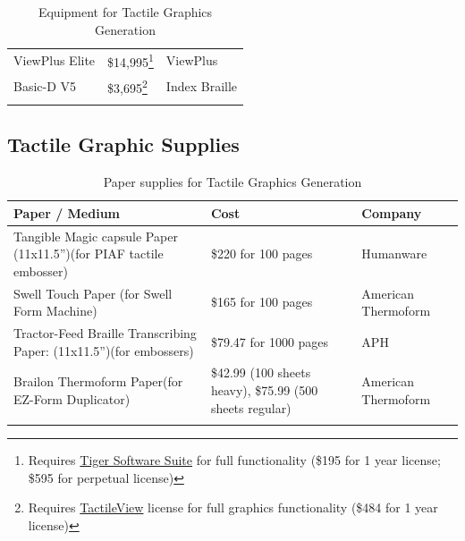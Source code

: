\documentclass[14pt, letterpaper,twoside]{extreport}
\begin{document}
\begin{longtable}[]{@{}
	>{\raggedright\arraybackslash}p{}
	>{\raggedright\arraybackslash}p{}
	>{\raggedright\arraybackslash}p{}@{}
	}
	ViewPlus Elite                                      & \$14,995\footnote{Requires \href{https://viewplus.com/product/tiger-software-suite8/}{Tiger Software Suite} for full functionality (\$195 for 1 year license; \$595 for perpetual license)} & ViewPlus            \\[1.0em]
	Basic-D V5                                          & \$3,695\footnote{Requires \href{https://tactileview.com/}{TactileView} license for full graphics functionality (\$484 for 1 year license)}                                                  & Index Braille       \\[1.0em]\hline \caption{ Equipment for Tactile Graphics Generation}
\end{longtable}



\hypertarget{tactile-paper}{%
	\subsection*{Tactile Graphic Supplies}\label{tactile-paper}}


\begin{longtable}[]{@{}
	>{\raggedright\arraybackslash}p{}
	>{\raggedright\arraybackslash}p{}
	>{\raggedright\arraybackslash}p{}@{}
	}
	\toprule\noalign{}

	\textbf{Paper / Medium}                                                    & \textbf{Cost}                                            & \textbf{Company}    \\
	\midrule\noalign{}
	\endhead
	\bottomrule\noalign{}
	\endlastfoot
	Tangible Magic capsule Paper (11x11.5'')\break(for PIAF tactile embosser)  & \$220 for 100 pages                                      & Humanware           \\[1.0em]
	Swell Touch Paper \break (for Swell Form Machine)                          & \$165 for 100 pages                                      & American Thermoform \\[1.0em]
	Tractor-Feed Braille Transcribing Paper: (11x11.5'')\break (for embossers) & \$79.47 for 1000 pages                                   & APH                 \\[1.0em]
	Brailon Thermoform Paper\break (for EZ-Form Duplicator)                    & \$42.99 (100 sheets heavy), \$75.99 (500 sheets regular) & American Thermoform \\[1.0em]\hline
	\caption{ Paper supplies for Tactile Graphics Generation }
\end{longtable}
\end{document}
